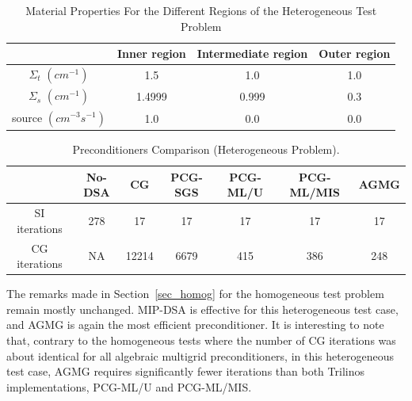 \documentclass[preprint,10pt]{elsarticle}
\renewcommand{\(}{\left(}
\renewcommand{\)}{\right)}
\renewcommand{\[}{\left[}
\renewcommand{\]}{\right]}
\begin{document}
%
\begin{table}[!htbp]
  \begin{center}
    \caption{Material Properties For the Different Regions of the Heterogeneous Test Problem}
    \begin{tabular}{|c|c|c|c|}
      \hline
       & Inner region & Intermediate region & Outer region \\ \hline
      $\Sigma_t$ $(cm^{-1}) $ & 1.5 & 1.0 & 1.0 \\
      $\Sigma_s$ $(cm^{-1}) $ & 1.4999 & 0.999 & 0.3 \\
     source $(cm^{-3}s^{-1})$ & 1.0 & 0.0 & 0.0 \\
      \hline
    \end{tabular}
    \label{hex_prop}
  \end{center}
\end{table}
%
%
\begin{table}[!htbp]
  \begin{center}
    \caption{Preconditioners Comparison (Heterogeneous Problem).}
    \begin{tabular}{|c|c|c|c|c|c|c|}
      \hline
      & No-DSA & CG & PCG-SGS & PCG-ML/U & PCG-ML/MIS & AGMG\\
      \hline
      SI iterations & 278     & 17      & 17        & 17       & 17      & 17  \\
      CG iterations & NA      & 12214   & 6679      & 415      & 386     & 248  \\
      \hline
    \end{tabular}
    \label{comparison_hex}
  \end{center}
\end{table}
%
The remarks made in Section~\ref {sec_homog} for the homogeneous test problem
remain mostly unchanged. MIP-DSA is effective for this heterogeneous test case, and AGMG is
again the most efficient preconditioner. It is interesting to note that, contrary to the
homogeneous tests where the number of CG iterations was about identical  for all
algebraic multigrid preconditioners, in this heterogeneous test case, AGMG requires
significantly fewer iterations than both Trilinos implementations, PCG-ML/U and PCG-ML/MIS.
\end{document}
